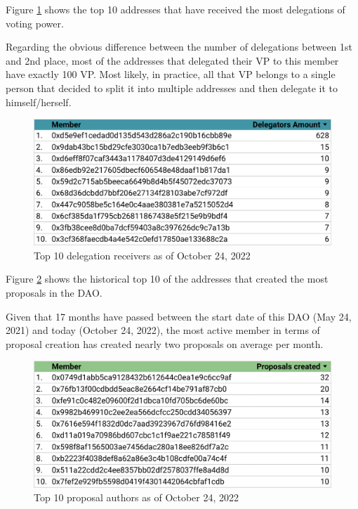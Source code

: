 \documentclass[MSE,Master,english]{twbook}%
\begin{document}
Figure \ref{fig:top_delegates} shows the top 10 addresses that have received the most delegations of voting power.

Regarding the obvious difference between the number of delegations between 1st and 2nd place, most of the addresses that delegated their VP to this member have exactly 100 VP. Most likely, in practice, all that VP belongs to a single person that decided to split it into multiple addresses and then delegate it to himself/herself.
\begin{figure}[H]
  \centering
  \includegraphics[width=\textwidth]{metrics/top_delegates.png}
  \caption{Top 10 delegation receivers as of October 24, 2022}
  \label{fig:top_delegates}
\end{figure}

Figure \ref{fig:top_authors} shows the historical top 10 of the addresses that created the most proposals in the DAO.

Given that 17 months have passed between the start date of this DAO (May 24, 2021) and today (October 24, 2022), the most active member in terms of proposal creation has created nearly two proposals on average per month.
\begin{figure}[H]
  \centering
  \includegraphics[width=\textwidth]{metrics/top_authors.png}
  \caption{Top 10 proposal authors as of October 24, 2022}
  \label{fig:top_authors}
\end{figure}
\end{document}
